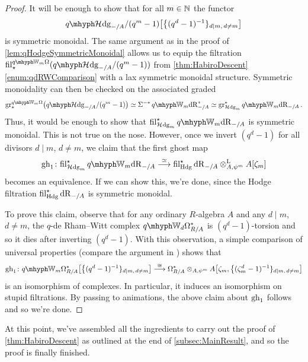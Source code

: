 \documentclass[DIV=12,numbers=enddot,leqno,bibliography=totoc]{scrartcl}
\begin{document}
	\begin{proof}
		It will be enough to show that for all $m\in\mathbb{N}$ the functor
		\begin{equation*}
			\qHhodge_{-/A}/(q^m-1)\left[\bigl\{(q^d-1)^{-1}\}_{d\mid m,\, d\neq m}\right]
		\end{equation*}
		is symmetric monoidal. The same argument as in the proof of \cref{lem:qHodgeSymmetricMonoidal} allows us to equip the filtration $ \fil_\star ^{\qIW_m\Omega}(\qHhodge_{-/A}/(q^m-1))$ from \cref{thm:HabiroDescent}\cref{enum:qdRWComparison} with a lax symmetric monoidal structure. Symmetric monoidality can then be checked on the associated graded
		\begin{equation*}
			\gr_*^{\qIW_m\Omega}\bigl(\qHhodge_{-/A}/(q^m-1)\bigr)\simeq \Sigma^{-*}\qIW_m\deRham_{-/A}^*\simeq \gr_{\Hhodge_m}^*\qIW_m\deRham_{-/A}\,.
		\end{equation*}
		Thus, it would be enough to show that $ \fil_{\Hhodge_m}^\star \qIW_m\deRham_{-/A}$ is symmetric monoidal. This is not true on the nose. However, once we invert $(q^d-1)$ for all divisors $d\mid m$, $d\neq m$, we claim that the first ghost map
		\begin{equation*}
			\gh_1\colon  \fil_{\Hhodge_m}^\star \qIW_m\deRham_{-/A}\overset{\simeq}{\longrightarrow} \fil_{\Hodge}^\star \deRham_{-/A}\lotimes_{A,\psi^m}A[\zeta_m]
		\end{equation*}
		becomes an equivalence. If we can show this, we're done, since the Hodge filtration $ \operatorname{fil}_{\mathrm{Hdg}}^\star \mathrm{dR}_{-/A}$ is symmetric monoidal.
		
		To prove this claim, observe that for any ordinary $R$-algebra $A$ and any $d\mid m$, $d\neq m$, the $q$-de Rham--Witt complex $\qIW_d\Omega_{R/A}^*$ is $(q^d-1)$-torsion and so it dies after inverting $(q^d-1)$. With this observation, a simple comparison of universal properties (compare the argument in \cite[Lemma~]{qWitt}) shows that
		\begin{equation*}
			\gh_1\colon \qIW_m\Omega_{R/A}^*\left[\bigl\{(q^d-1)^{-1}\}_{d\mid m,\, d\neq m}\right]\overset{\cong}{\longrightarrow} \Omega_{R/A}^*\otimes_{A,\psi^m}A\left[\zeta_m,\bigl\{(\zeta_m^d-1)^{-1}\}_{d\mid m,\, d\neq m}\right]
		\end{equation*}
		is an isomorphism of complexes. In particular, it induces an isomorphism on stupid filtrations. By passing to animations, the above claim about $\operatorname{gh}_1$ follows and so we're done.
	\end{proof}
	At this point, we've assembled all the ingredients to carry out the proof of \cref{thm:HabiroDescent} as outlined at the end of \cref{subsec:MainResult}, and so the proof is finally finished.
	
\end{document}
